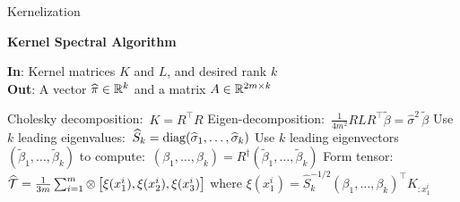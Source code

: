 \documentclass[final,t]{beamer}
\begin{document}
\begin{frame}{}
\begin{columns}[t]
\begin{column}{.3\linewidth}
\begin{block}{Kernelization}
          \vspace{-2mm}
          \begin{center}
          \hline
          \hline
          \vspace{2mm}
          \textbf{Kernel Spectral Algorithm}\\
          \hline
          \end{center}
          \textbf{In}: Kernel matrices $K$ and $L$, and desired rank $k$ \\
          \textbf{Out}: A vector $\widehat \pi \in \mathbb{R}^k$ and a matrix $A \in \mathbb{R}^{2m\times k}$\\[-0.4cm]
          \begin{algorithmic}[1]
            \STATE Cholesky decomposition:\ $K=R^\top R$
            \STATE Eigen-decomposition:\ $\frac{1}{4m^2} R L R^\top \widetilde{\beta} = \widehat \sigma^2\,\widetilde{\beta}$
            \STATE Use $k$ leading eigenvalues:\ $\widehat S_k = \mathop{\mathrm{diag}}(\widehat \sigma_1,\ldots,\widehat \sigma_k)$
            \STATE Use $k$ leading eigenvectors $(\widetilde{\beta}_1,\ldots,\widetilde{\beta}_k)$ to
            compute:\ $(\beta_1,\ldots,\beta_k) = R^\dagger (\widetilde{\beta}_1,\ldots,\widetilde{\beta}_k)$
            \STATE Form tensor: $\widehat {{\mathcal{T}}} = \frac{1}{3m}\sum\nolimits_{i=1}^m \otimes\left[\xi(x_1^i), \xi(x_2^i), \xi(x_3^i)\right]$ where $\xi(x_1^i) = \widehat S_k^{-1/2} (\beta_1,\ldots,\beta_k)^\top K_{:x_1^i}$

\end{algorithmic}
\end{block}
\end{column}
\end{columns}
\end{frame}
\end{document}

